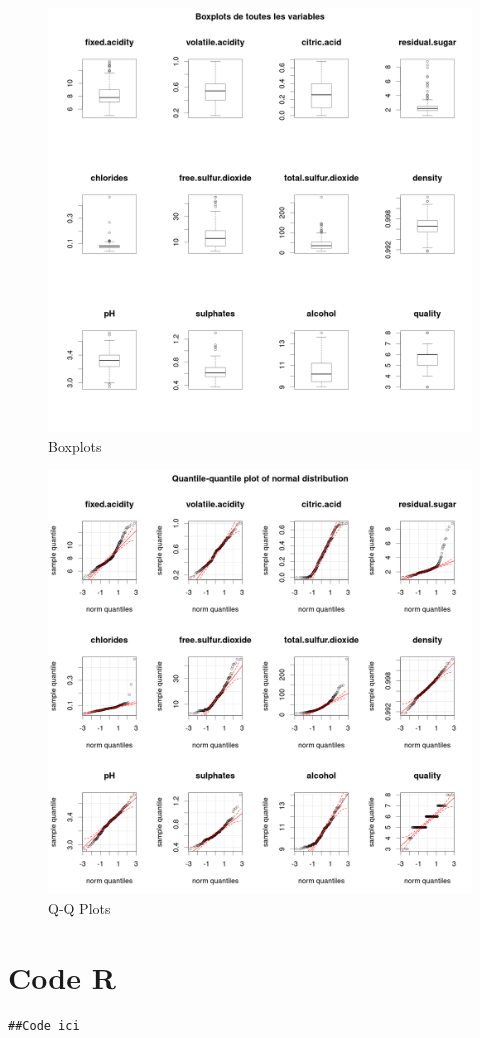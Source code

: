 \documentclass[11pt,a4paper]{article}
\begin{document}
\begin{figure}


\includegraphics[width=\textwidth,keepaspectratio]{"boxplot"}
\caption{Boxplots}
\label{fig:boxplot}
\end{figure}
\begin{figure}

	\includegraphics[width=\textwidth,keepaspectratio]{"qqplot"}
	
	\caption{Q-Q Plots}
	\label{fig:qqplot}
\end{figure}
\FloatBarrier

\section{Code R}
\lstset{language=R}
\begin{lstlisting}[breaklines]
##Code ici
\end{lstlisting}
\end{document}
